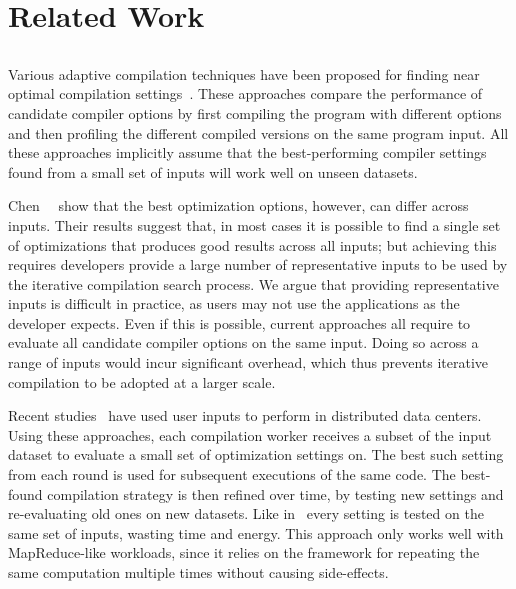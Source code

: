 \section{Related Work}\label{sec:relatedwork}

\subsection{{\IterComp}}
Various adaptive compilation techniques have been proposed for finding near optimal compilation 
settings~\cite{agakov06,kulkarni04,stephenson03,hoste08}. These approaches compare the performance of candidate compiler options by first
compiling the program with different options and then profiling the different compiled versions on the same program input. All these
approaches implicitly assume that the best-performing compiler settings found from a small set of inputs will work well on unseen datasets.

Chen~\etal~\cite{chen10,chen12a} show that the best optimization options, however, can differ across inputs. Their results suggest that, in
most cases it is possible to find a single set of optimizations that produces good results across all inputs; but achieving this requires
developers provide a large number of representative inputs to be used by the iterative compilation search process. We argue that providing
representative inputs is difficult in practice, as users may not use the applications as the developer expects. Even if this is possible,
current approaches all require to evaluate all candidate compiler options on the same input. Doing so across a range of inputs would incur
significant overhead, which thus prevents iterative compilation to be adopted at a larger scale.

Recent studies~\cite{chen12b,fang15} have used user inputs to perform {\itercomp} in distributed data centers. Using these approaches, each
compilation worker receives a subset of the input dataset to evaluate a small set of optimization settings on. The best such setting from
each round is used for subsequent executions of the same code. The best-found compilation strategy is then refined over time, by testing
new settings and re-evaluating old ones on new datasets. Like in~\cite{chen10} every setting is tested on the same set of inputs, wasting
time and energy. This approach only works well with MapReduce-like workloads, since it relies on the framework for repeating the same
computation multiple times without causing side-effects.

